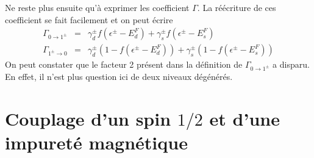 Ne reste plus ensuite qu'à exprimer les coefficient $\Gamma$. La réécriture de ces coefficient se fait facilement et on peut écrire 
\begin{eqnarray}
\Gamma_{0 \rightarrow 1^\pm} &=&  \gamma_d^\pm f(\epsilon^\pm - E_d^F) + \gamma_s^\pm f(\epsilon^\pm - E_s^F)\\
\Gamma_{1^\pm \rightarrow 0} &=& \gamma_d^\pm (1- f(\epsilon^\pm - E_d^F)) + \gamma_s^\pm (1- f(\epsilon^\pm - E_s^F)) 
\end{eqnarray}
On peut constater que le facteur 2 présent dans la définition de $\Gamma_{0 \rightarrow 1^\pm}$ a disparu. En effet, il n'est plus question ici de deux niveaux dégénérés.

\section{Couplage d'un spin $1/2$ et d'une impureté magnétique}
